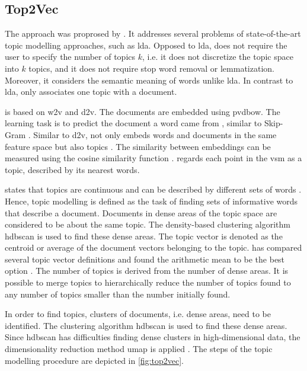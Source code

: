 \subsection{Top2Vec}\label{subsec:top2vec}

The approach \topTwovec{} was proprosed by \citeauthor{Top2Vec2020} \cite{Top2Vec2020}.
It addresses several problems of state-of-the-art topic modelling approaches, such as \ac{lda}.
Opposed to \ac{lda}, \topTwovec{} does not require the user to specify the number of topics $k$, 
i.e. it does not discretize the topic space into $k$ topics, 
and it does not require stop word removal or lemmatization.
Moreover, it considers the semantic meaning of words unlike \ac{lda}.
In contrast to \ac{lda}, \topTwovec{} only associates one topic with a document.

\topTwovec{} is based on \ac{w2v} and \ac{d2v}.
The documents are embedded using \ac{pvdbow}.
The learning task is to predict the document a word came from \cite{Top2Vec2020}, similar to Skip-Gram \cite{Topic2Vec2015}.
Similar to \ac{d2v}, \topTwovec{} not only embeds words and documents in the same feature space but also topics \cite{Top2Vec2020, Topic2Vec2015}.
The similarity between embeddings can be measured using the cosine similarity function \cite{Topic2Vec2015}.
\citeauthor{Top2Vec2020} regards each point in the \ac{vsm} as a topic, described by its nearest words.

\citeauthor{Top2Vec2020} states that topics are continuous and can be described by different sets of words \cite{Top2Vec2020}.
Hence, topic modelling is defined as the task of finding sets of informative words that describe a document.
Documents in dense areas of the topic space are considered to be about the same topic.
The density-based clustering algorithm \ac{hdbscan} is used to find these dense areas.
The topic vector is denoted as the centroid or average of the document vectors belonging to the topic.
\citeauthor{Top2Vec2020} has compared several topic vector definitions and found the arithmetic mean to be the best option \cite{Top2Vec2020}.
The number of topics is derived from the number of dense areas.
It is possible to merge topics to hierarchically reduce the number of topics found to any number of topics smaller than the number initially found.

In order to find topics, clusters of documents, i.e. dense areas, need to be identified.
The clustering algorithm \ac{hdbscan} is used to find these dense areas.
Since \ac{hdbscan} has difficulties finding dense clusters in high-dimensional data, 
the dimensionality reduction method \ac{umap} is applied \cite{Top2Vec2020}.
The steps of the topic modelling procedure \topTwovec{} are depicted in \autoref{fig:top2vec}.

